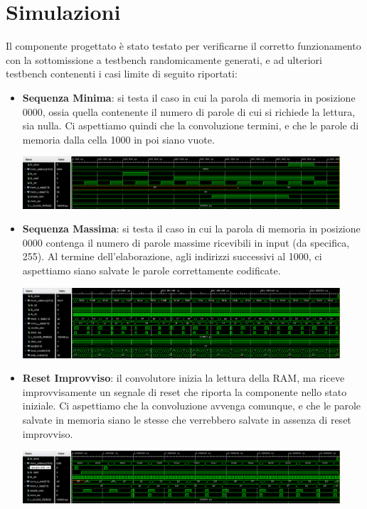 \section{Simulazioni}
Il componente progettato è stato testato per verificarne il corretto funzionamento con la sottomissione a testbench randomicamente generati, e ad ulteriori testbench contenenti i casi limite di seguito riportati: 
\begin{itemize}
    \item \textbf{Sequenza Minima}: si testa il caso in cui la parola di memoria in posizione 0000, ossia quella contenente il numero di parole di cui si richiede la lettura, sia nulla. Ci aspettiamo quindi che la convoluzione termini, e che le parole di memoria dalla cella 1000 in poi siano vuote.
    \begin{center}
    \includegraphics[width=0.93\textwidth]{images/simulations/SeqMin.png}
    \end{center}
    \item \textbf{Sequenza Massima}: si testa il caso in cui la parola di memoria in posizione 0000 contenga il numero di parole massime ricevibili in input (da specifica, 255). Al termine dell’elaborazione, agli indirizzi successivi al 1000, ci aspettiamo siano salvate le parole correttamente codificate.
    \begin{center}
    \includegraphics[width=0.93\textwidth]{images/simulations/SeqMax.png}
    \end{center}
    \item \textbf{Reset Improvviso}: il convolutore inizia la lettura della RAM, ma riceve improvvisamente un segnale di reset che riporta la componente nello stato iniziale. Ci aspettiamo che la convoluzione avvenga comunque, e che le parole salvate in memoria siano le stesse che verrebbero salvate in assenza di reset improvviso.
    \begin{center}
    \includegraphics[width=0.93\textwidth]{images/simulations/TBReset.png}

\end{center}
\end{itemize}
